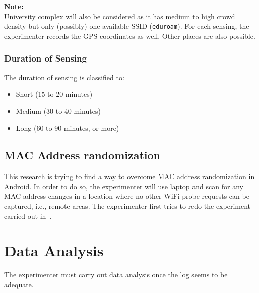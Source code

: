 \documentclass{article}
\begin{document}
\noindent\textbf{Note:}\\
University complex will also be considered as it has medium to high crowd density but only (possibly) one available SSID (\texttt{eduroam}). For each sensing, the experimenter records the GPS coordinates as well. Other places are also possible.

\subsubsection*{Duration of Sensing} %
\label{ssub:duration_of_sensing}
The duration of sensing is classified to:
\begin{itemize}
	\item Short (15 to 20 minutes)
	\item Medium (30 to 40 minutes)
	\item Long (60 to 90 minutes, or more)
\end{itemize}


\subsection{MAC Address randomization} %
\label{sub:mac_address_randomization}
This research is trying to find a way to overcome MAC address randomization in Android. In order to do so, the experimenter will use laptop and scan for any MAC address changes in a location where no other WiFi probe-requests can be captured, i.e., remote areas. The experimenter first tries to redo the experiment carried out in~\cite{thesis060,thesis061,randomization}.

\section{Data Analysis} %
\label{sec:data_processing_and_analysis}
The experimenter must carry out data analysis once the log seems to be adequate.
\end{document}

